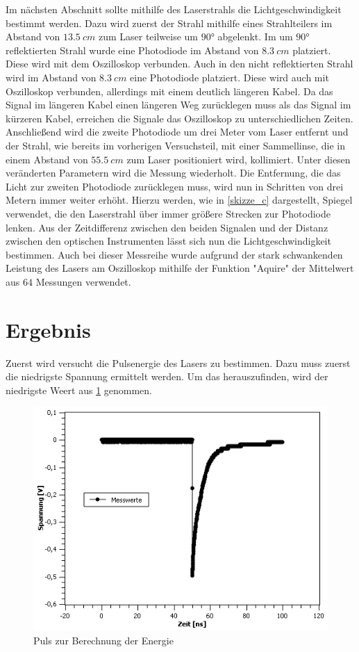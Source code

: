 \documentclass[
	a4paper,
	12pt,
	pagesize,
	ngerman
]{scrartcl}
\begin{document}
Im nächsten Abschnitt sollte mithilfe des Laserstrahls die Lichtgeschwindigkeit bestimmt werden. Dazu wird zuerst der Strahl mithilfe eines Strahlteilers im Abstand von $\SI{13,5}{cm}$ zum Laser teilweise um $90$° abgelenkt. Im um $90$° reflektierten Strahl wurde eine Photodiode im Abstand von $\SI{8,3}{cm}$ platziert. Diese wird mit dem Oszilloskop verbunden. Auch in den nicht reflektierten Strahl wird im Abstand von $\SI{8,3}{cm}$ eine Photodiode platziert. Diese wird auch mit Oszilloskop verbunden, allerdings mit einem deutlich längeren Kabel. Da das Signal im längeren Kabel einen längeren Weg zurücklegen muss als das Signal im kürzeren Kabel, erreichen die Signale das Oszilloskop zu unterschiedlichen Zeiten.
Anschließend wird die zweite Photodiode um drei Meter vom Laser entfernt und der Strahl, wie bereits im vorherigen Versuchsteil, mit einer Sammellinse, die in einem Abstand von $\SI{55,5}{cm}$ zum Laser positioniert wird, kollimiert. Unter diesen veränderten Parametern wird die Messung wiederholt. Die Entfernung, die das Licht zur zweiten Photodiode zurücklegen muss, wird nun in Schritten von drei Metern immer weiter erhöht. Hierzu werden, wie in \cref{skizze_c} dargestellt, Spiegel verwendet, die den Laserstrahl über immer größere Strecken zur Photodiode lenken.
Aus der Zeitdifferenz zwischen den beiden Signalen und der Distanz zwischen den optischen Instrumenten lässt sich nun die Lichtgeschwindigkeit bestimmen.
Auch bei dieser Messreihe wurde aufgrund der stark schwankenden Leistung des Lasers am Oszilloskop mithilfe der Funktion "Aquire" der Mittelwert aus $64$ Messungen verwendet.

\section{Ergebnis}
Zuerst wird versucht die Pulsenergie des Lasers zu bestimmen. Dazu muss zuerst die niedrigste Spannung ermittelt werden. Um das herauszufinden, wird der niedrigste Weert aus \cref{Energie} genommen. 

\begin{figure}[h!]
	\centering
	\includegraphics[scale=0.7]{Energie.png}
	\caption{Puls zur Berechnung der Energie}
	\label{Energie}
\end{figure}
\end{document}
